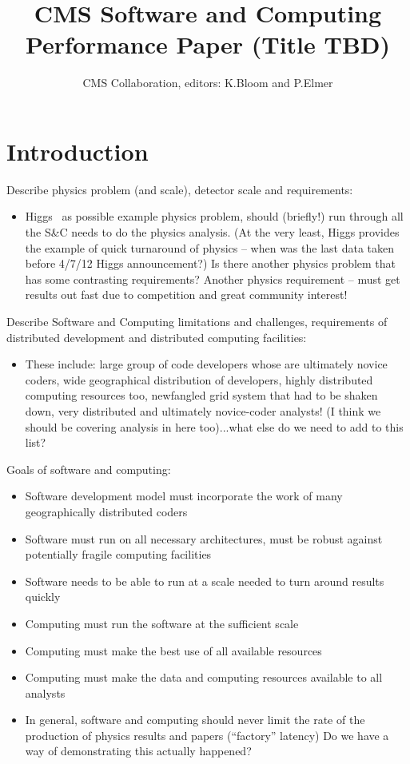 \documentclass [draft,notitlepage] {article}
\title{CMS Software and Computing Performance Paper (Title TBD)}
\author{CMS Collaboration, editors: K.Bloom and P.Elmer}
\begin{document}
\maketitle

\section{Introduction}

Describe physics problem (and scale), detector scale and requirements:

\begin{itemize}
\item Higgs~\cite{CMSHIGGS} as possible example physics problem, should (briefly!) run through all the S\&C needs to do the physics analysis.  (At the very least, Higgs provides the example of quick turnaround of physics -- when was the last data taken before 4/7/12 Higgs announcement?)  Is there another physics problem that has some contrasting requirements?  Another physics requirement -- must get results out fast due to competition and great community interest!
\end{itemize}

Describe Software and Computing limitations and challenges, requirements of distributed development and distributed computing facilities:

\begin{itemize}
\item These include: large group of code developers whose are ultimately novice coders, wide geographical distribution of developers, highly distributed computing resources too, newfangled grid system that had to be shaken down, very distributed and ultimately novice-coder analysts! (I think we should be covering analysis in here too)...what else do we need to add to this list?
\end{itemize}

Goals of software and computing:

\begin{itemize}
\item Software development model must incorporate the work of many geographically distributed coders
\item Software must run on all necessary architectures, must be robust against potentially fragile computing facilities
\item Software needs to be able to run at a scale needed to turn around results quickly
\item Computing must run the software at the sufficient scale
\item Computing must make the best use of all available resources
\item Computing must make the data and computing resources available to all analysts
\item In general, software and computing should never limit the rate of the production of physics results and papers (``factory'' latency) Do we have a way of demonstrating this actually happened?
\end{itemize}
\end{document}
